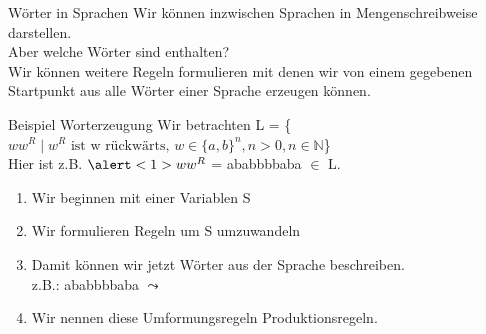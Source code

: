 %
%
%
%

\begin{frame}[fragile]{Wörter in Sprachen}
Wir können inzwischen Sprachen in Mengenschreibweise darstellen.\\Aber welche Wörter sind enthalten?\\
\vspace{0.3cm}
Wir können weitere Regeln formulieren mit denen wir von einem gegebenen Startpunkt aus alle Wörter einer Sprache erzeugen können.
\end{frame}

\begin{frame}[fragile]{Beispiel Worterzeugung}
    \small{Wir betrachten L = \{$ww^R\;|\;w^R\text{ ist w rückwärts, }w \in \{a, b\}^n, n>0, n\in \mathbb{N}$\}\\
    Hier ist z.B. $\alert<1>{w}w^R$ = \alert<1>{ababb}bbaba $\in$ L.}\\
    \begin{enumerate}
    \item <2-> 
            \alert<2,5>{Wir beginnen mit einer Variablen S}
    \item <3-> 
            \alert<3>{Wir formulieren Regeln um S umzuwandeln}
            \alert<4>{}\vspace{-0.3in}
    \item <5->
            \alert<5>{Damit können wir jetzt Wörter aus der Sprache beschreiben.}\\
            z.B.: \alert<6>{a}\alert<7>{b}\alert<8>{a}\alert<9>{b}\alert<10>{bb}\alert<9>{b}\alert<8>{a}\alert<7>{b}\alert<6>{a} $\leadsto$ 
    \item <11> \alert<11>{Wir nennen diese Umformungsregeln Produktionsregeln.}
    \end{enumerate}
\end{frame}

